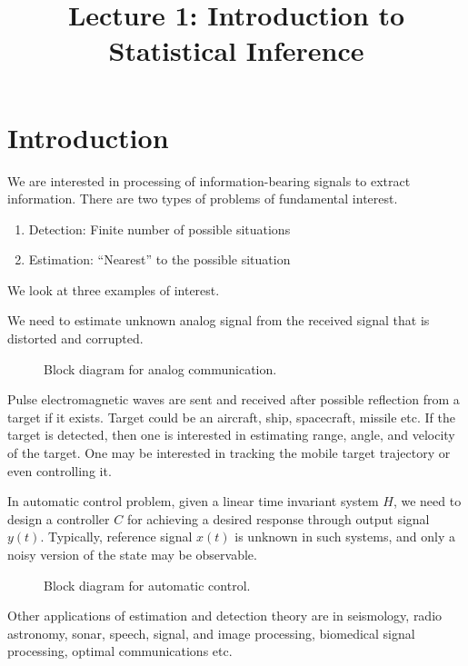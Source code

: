 \documentclass[a4paper,english,12pt]{article}
\title{Lecture 1: Introduction to Statistical Inference}
\author{}
\begin{document}
\maketitle

\section{Introduction}
We are interested in processing of information-bearing signals to extract information. 
There are two types of problems of fundamental interest.
\begin{enumerate}
\item Detection: Finite number of possible situations
\item Estimation: ``Nearest'' to the possible situation
\end{enumerate}
We look at three examples of interest.
\begin{exmp} 
We need to estimate unknown analog signal from the received signal that is distorted and corrupted.
\begin{figure}[hhhh]
\centering

\caption{Block diagram for analog communication.}
\label{Fig:AnalogComm}
\end{figure}
\end{exmp}
\begin{exmp} 
Pulse electromagnetic waves are sent and received after possible reflection from a target if it exists. 
Target could be an aircraft, ship, spacecraft, missile etc.
If the target is detected, then one is interested in estimating range, angle, and velocity of the target. 
One may be interested in tracking the mobile target trajectory or even controlling it.
%
\end{exmp}
\begin{exmp}
In automatic control problem, given a linear time invariant system $H$, we need to design a controller $C$ for achieving a desired response through output signal $y(t)$. 
Typically, reference signal $x(t)$ is unknown in such systems, and only a noisy version of the state may be observable.
\begin{figure}[hhhh]
\centering

\caption{Block diagram for automatic control.}
\label{Fig:AutoControl}
\end{figure}
\end{exmp}
Other applications of estimation and detection theory are in seismology, radio astronomy, sonar, speech, signal, and image processing, biomedical signal processing, optimal communications etc.
\end{document}
